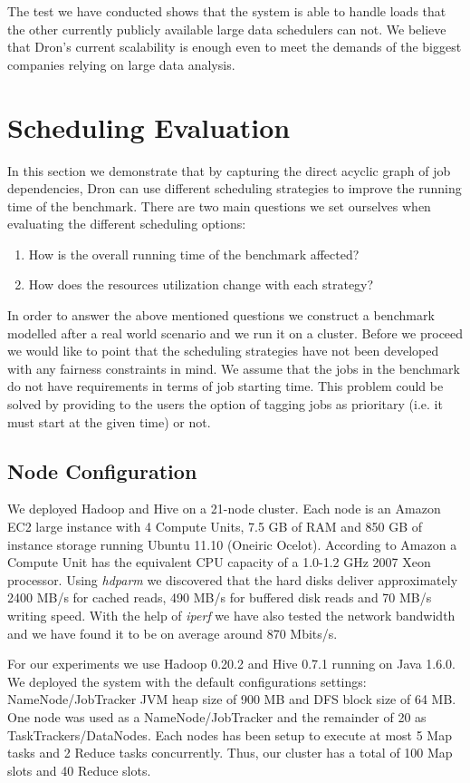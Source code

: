 \documentclass[11pt,a4paper,twoside]{report}
\begin{document}
The test we have conducted shows that the system is able to handle loads that the other currently publicly available large data schedulers can not. We believe that Dron's current scalability is enough even to meet the demands of the biggest companies relying on large data analysis.


\section{Scheduling Evaluation}
\label{sec:schedulingEvaluation}
In this section we demonstrate that by capturing the direct acyclic graph of job dependencies, Dron can use different scheduling strategies to improve the running time of the benchmark. There are two main questions we set ourselves when evaluating the different scheduling options:
\begin{enumerate}
\item{}
How is the overall running time of the benchmark affected?
\item{}
How does the resources utilization change with each strategy?
\end{enumerate}

In order to answer the above mentioned questions we construct a benchmark modelled after a real world scenario and we run it on a cluster. Before we proceed we would like to point that the scheduling strategies have not been developed with any fairness constraints in mind. We assume that the jobs in the benchmark do not have requirements in terms of job starting time. This problem could be solved by providing to the users the option of tagging jobs as prioritary (i.e. it must start at the given time) or not.

\subsection{Node Configuration}
We deployed Hadoop and Hive on a 21-node cluster. Each node is an Amazon EC2 large instance with 4 Compute Units, 7.5 GB of RAM and 850 GB of instance storage running Ubuntu 11.10 (Oneiric Ocelot). According to Amazon a Compute Unit has the equivalent CPU capacity of a 1.0-1.2 GHz 2007 Xeon processor. Using \textit{hdparm} we discovered that the hard disks deliver approximately 2400 MB/s for cached reads, 490 MB/s for buffered disk reads and 70 MB/s writing speed. With the help of \textit{iperf} we have also tested the network bandwidth and we have found it to be on average around 870 Mbits/s.


For our experiments we use Hadoop 0.20.2 and Hive 0.7.1 running on Java 1.6.0. We deployed the system with the default configurations settings: NameNode/JobTracker JVM heap size of 900 MB and DFS block size of 64 MB. One node was used as a NameNode/JobTracker and the remainder of 20 as TaskTrackers/DataNodes. Each nodes has been setup to execute at most 5 Map tasks and 2 Reduce tasks concurrently. Thus, our cluster has a total of 100 Map slots and 40 Reduce slots.
\end{document}
